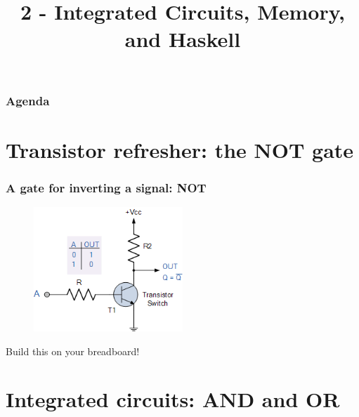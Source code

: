 \documentclass{beamer}
\title{2 - Integrated Circuits, Memory, and Haskell}
\author{}
\date{}
\begin{document}
\frame{\titlepage}

\begin{frame}
  \frametitle{Agenda}
  \tableofcontents
\end{frame}

\section{Transistor refresher: the NOT gate}

\begin{frame}
  \frametitle{A gate for inverting a signal: NOT}
  \begin{figure}
    \centering
    \includegraphics[width=0.5\textwidth]{res/not-gate.png}
  \end{figure}

  Build this on your breadboard!
\end{frame}

\section{Integrated circuits: AND and OR}
\end{document}

